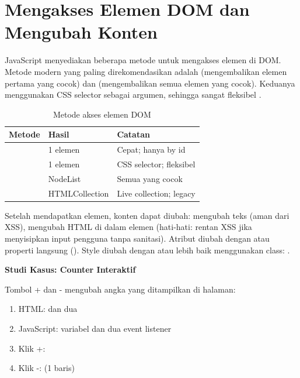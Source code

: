 ﻿\section{Mengakses Elemen DOM dan Mengubah Konten}

JavaScript menyediakan beberapa metode untuk mengakses elemen di DOM. Metode modern yang paling direkomendasikan adalah  (mengembalikan elemen pertama yang cocok) dan  (mengembalikan semua elemen yang cocok). Keduanya menggunakan CSS selector sebagai argumen, sehingga sangat fleksibel \cite{mdnJsGuide}.

\begin{table}[H]
\centering
\begin{tabular}{|P{5cm}|P{2.5cm}|P{4.5cm}|}
\hline
\textbf{Metode} & \textbf{Hasil} & \textbf{Catatan} \\
\hline
{} & 1 elemen & Cepat; hanya by id \\
\hline
{} & 1 elemen & CSS selector; fleksibel \\
\hline
{} & NodeList & Semua yang cocok \\
\hline
{} & HTMLCollection & Live collection; legacy \\
\hline
\end{tabular}
\caption{Metode akses elemen DOM}
\end{table}

Setelah mendapatkan elemen, konten dapat diubah:  mengubah teks (aman dari XSS),  mengubah HTML di dalam elemen (hati-hati: rentan XSS jika menyisipkan input pengguna tanpa sanitasi). Atribut diubah dengan  atau properti langsung (). Style diubah dengan  atau lebih baik menggunakan class:  \cite{jsInfo}.

\begin{contoh}
\textbf{Studi Kasus: Counter Interaktif}

Tombol + dan - mengubah angka yang ditampilkan di halaman:
\begin{enumerate}
  \item HTML:  dan dua 
  \item JavaScript: variabel  dan dua event listener
  \item Klik +: 
  \item Klik -:  (1 baris)
\end{enumerate}
\end{contoh}

